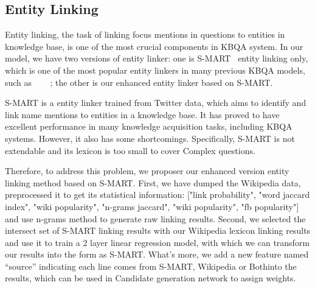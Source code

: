 \subsection{Entity Linking}
\label{sec:entitylinking}


Entity linking, the task of linking focus mentions in questions to entities in knowledge base, is one of the most crucial components in KBQA system. In our model, we have two versions of entity linker: one is S-MART~\cite{yang2015s} entity linking only, which is one of the most popular entity linkers in many previous KBQA models, such as ~\cite{yih2015semantic}~\cite{bao2016constraint}~\cite{yu2017improved}
; the other is our enhanced entity linker based on S-MART.

S-MART is a entity linker trained from Twitter data, which aims to identify and link name mentions to entities in a knowledge base. It has proved to have excellent performance in many knowledge acquisition tasks, including KBQA systems. However, it also has some shortcomings. Specifically, S-MART is not extendable and its lexicon is too small to cover Complex questions.

Therefore, to address this problem, we proposer our enhanced version entity linking method based on S-MART. First, we have dumped the Wikipedia data, preprocessed it to get its statistical information: ["link probability", "word jaccard index", "wiki popularity", "n-grams jaccard", "wiki popularity", "fb popularity"] and use n-grams method to generate raw linking results. Second, we selected the intersect set of S-MART linking results with our Wikipedia lexicon linking results and use it to train a 2 layer linear regression model, with which we can transform our results into the form as S-MART. What’s more, we add a new feature named “source” indicating each line comes from S-MART, Wikipedia or Bothinto the results, which can be used in Candidate generation network to assign weights. 
